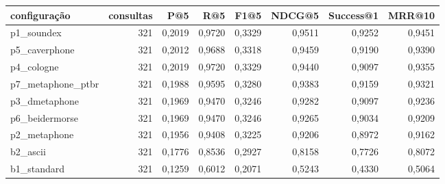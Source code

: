 \begin{tabular}{lrrrrrrr}
\hline
configuração & consultas & P@5 & R@5 & F1@5 & NDCG@5 & Success@1 & MRR@10 \\
\hline
p1\_soundex & 321 & 0,2019 & 0,9720 & 0,3329 & 0,9511 & 0,9252 & 0,9451 \\
p5\_caverphone & 321 & 0,2012 & 0,9688 & 0,3318 & 0,9459 & 0,9190 & 0,9390 \\
p4\_cologne & 321 & 0,2019 & 0,9720 & 0,3329 & 0,9440 & 0,9097 & 0,9355 \\
p7\_metaphone\_ptbr & 321 & 0,1988 & 0,9595 & 0,3280 & 0,9383 & 0,9159 & 0,9321 \\
p3\_dmetaphone & 321 & 0,1969 & 0,9470 & 0,3246 & 0,9282 & 0,9097 & 0,9236 \\
p6\_beidermorse & 321 & 0,1969 & 0,9470 & 0,3246 & 0,9265 & 0,9034 & 0,9209 \\
p2\_metaphone & 321 & 0,1956 & 0,9408 & 0,3225 & 0,9206 & 0,8972 & 0,9162 \\
b2\_ascii & 321 & 0,1776 & 0,8536 & 0,2927 & 0,8158 & 0,7726 & 0,8072 \\
b1\_standard & 321 & 0,1259 & 0,6012 & 0,2071 & 0,5243 & 0,4330 & 0,5064 \\
\hline
\end{tabular}